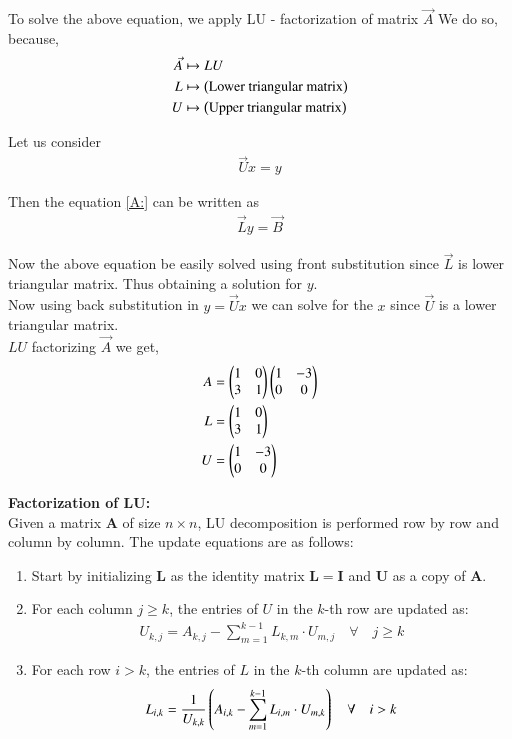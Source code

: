 \documentclass[journal]{IEEEtran}
\numberwithin{equation}{enumi}
\numberwithin{figure}{enumi}
\begin{document}
To solve the above equation, we apply LU - factorization of matrix $\Vec{A}$
We do so, because,
\begin{align}
    \Vec{A} &\mapsto LU\\
    L &\mapsto \left(\text{Lower triangular matrix}\right)\\
    U &\mapsto \left(\text{Upper triangular matrix}\right)
\end{align}

Let us consider
\begin{align}
    \Vec{U}x = y
\end{align}

Then the equation \eqref{A:} can be written as
\begin{align}
    \Vec{L}y = \Vec{B}
\end{align}

Now the above equation be easily solved using front substitution since $\Vec{L}$ is lower triangular matrix. Thus obtaining a solution for $y$.\\

Now using back substitution in $y = \Vec{U}x$ we can solve for the $x$ since $\Vec{U}$ is a lower triangular matrix.\\

$LU$ factorizing $\Vec{A}$ we get,
\begin{align}
    A &= \begin{pmatrix}1 & 0 \\ 3 & 1\end{pmatrix}\begin{pmatrix}1 & -3 \\ 0 & 0\end{pmatrix}\\
    L &= \begin{pmatrix}1 & 0 \\ 3 & 1\end{pmatrix}\\
    U &= \begin{pmatrix}1 & -3 \\ 0 & 0\end{pmatrix}
\end{align}

\textbf{Factorization of LU:}\\
Given a matrix $ \mathbf{A} $ of size $ n \times n $, LU decomposition is performed row by row and column by column. The update equations are as follows: 
\begin{enumerate}
    \item Start by initializing $ \mathbf{L} $ as the identity matrix $ \mathbf{L} = \mathbf{I} $ and $ \mathbf{U} $ as a copy of $ \mathbf{A} $.\\
    \item For each column $ j \geq k $, the entries of $ U $ in the $ k $-th row are updated as:
    \begin{align}
        U_{k,j} = A_{k,j} - \sum_{m=1}^{k-1} L_{k,m} \cdot U_{m,j}\quad \forall \quad j \geq k
    \end{align}
    \item For each row $ i > k $, the entries of $ L $ in the $ k $-th column are updated as:
    \begin{align}
        L_{i,k} = \frac{1}{U_{k,k}} \left( A_{i,k} - \sum_{m=1}^{k-1} L_{i,m} \cdot U_{m,k}\right) \quad \forall \quad i > k
    \end{align}
\end{enumerate}
\end{document}
